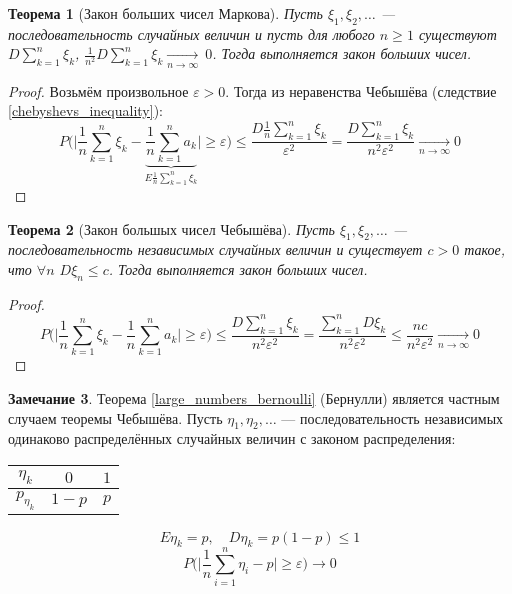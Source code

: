 \documentclass[11pt,openany,a4paper]{scrartcl}
\theoremstyle{plain}
\newtheorem{theorem}{Теорема}[subsection]
\theoremstyle{definition}
\newtheorem{remark}[theorem]{Замечание}
\newcommand{\underto}[1]{\xrightarrow[#1]{}}
\begin{document}
\begin{theorem}[Закон больших чисел Маркова]
    Пусть $\xi_1, \xi_2,\ldots$ — последовательность случайных величин и пусть
    для любого $n \geqslant 1$ существуют $D\sum\limits_{k=1}^n \xi_k$,
    $\frac{1}{n^2}D\sum\limits_{k=1}^n \xi_k \underto{n \to \infty}~0$.
    Тогда выполняется закон больших чисел.
\end{theorem}
\begin{proof}
    Возьмём произвольное $\varepsilon > 0$. Тогда из неравенства Чебышёва
    (следствие \ref{chebyshevs_inequality}):
    $$
    P\bigg(\bigg|\frac{1}{n}\sum\limits_{k=1}^n\xi_k -
    \underbrace{\frac{1}{n}\sum\limits_{k=1}^na_k}_
    {E\frac{1}{n}\sum\limits_{k=1}^n \xi_k}
    \bigg| \geqslant \varepsilon\bigg) \leqslant
    \frac{D\frac{1}{n}\sum\limits_{k=1}^n \xi_k}{\varepsilon^2} =
    \frac{D\sum\limits_{k=1}^n \xi_k}{n^2 \varepsilon^2}
    \underto{n \to \infty} 0
    $$
\end{proof}
\begin{theorem}[Закон большых чисел Чебышёва]
    Пусть $\xi_1, \xi_2,\ldots$ — последовательность независимых случайных величин
    и существует $c > 0$ такое, что $\forall n$ $D\xi_n \leqslant c$. Тогда
    выполняется закон больших чисел.
\end{theorem}
\begin{proof}
    $$
    P\bigg(\bigg|\frac{1}{n}\sum\limits_{k=1}^n\xi_k -
    \frac{1}{n}\sum\limits_{k=1}^na_k\bigg| \geqslant \varepsilon\bigg) \leqslant
    \frac{D\sum\limits_{k=1}^n\xi_k}{n^2\varepsilon^2} =
    \frac{\sum\limits_{k=1}^n D\xi_k}{n^2\varepsilon^2} \leqslant
    \frac{nc}{n^2\varepsilon^2} \underto{n \to \infty} 0
    $$
\end{proof}
\begin{remark}
    Теорема \ref{large_numbers_bernoulli} (Бернулли) является частным случаем
    теоремы Чебышёва.
    Пусть $\eta_1, \eta_2,\ldots$ — последовательность независимых одинаково
    распределённых случайных величин с законом распределения:
    \begin{center}
        \begin{tabular}{| c | c | c |}
            \hline
            $\eta_k$ & $0$ & $1$ \\ \hline
            $p_{\eta_k}$ & $1-p$ & $p$ \\ \hline
        \end{tabular}
    \end{center}
    $$
    E\eta_k = p,\quad D\eta_k = p(1-p) \leqslant 1
    $$
    $$
    P\bigg(\bigg|\frac{1}{n}\sum\limits_{i=1}^n \eta_i - p\bigg| \geqslant 
    \varepsilon\bigg) \to 0
    $$
\end{remark}
\end{document}
